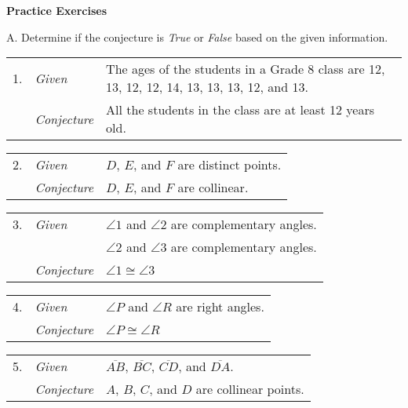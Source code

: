 \textbf{Practice Exercises}

\vspce

A. Determine if the conjecture is \emph{True} or \emph{False} based on the given information. 
\vspce 

\begin{tabular}{rN{5em}M{20em}}
1. & \textit{Given} & The ages of the students in a Grade 8 class are 12, 13, 12, 12, 14, 13, 13, 13, 12, and 13.\\
& \textit{Conjecture} & All the students in the class are at least 12 years old. \\
\end{tabular} 

\begin{tabular}{rN{5em}M{20em}}
2. & \textit{Given} & $D$, $E$, and $F$ are distinct points.\\
& \textit{Conjecture} & $D$, $E$, and $F$ are collinear.\\
\end{tabular} 

\begin{tabular}{rN{5em}M{20em}}
3. & \textit{Given} & $\angle{1}$ and $\angle{2}$ are complementary angles. \\
 & & $\angle{2}$ and $\angle{3}$ are complementary angles. \\
& \textit{Conjecture} & $\angle{1} \cong \angle{3} $\\
\end{tabular} 
  
\begin{tabular}{rN{5em}M{20em}}
4. & \textit{Given} & $\angle{P}$ and $\angle{R}$ are right  angles.\\
& \textit{Conjecture} & $\angle{P} \cong \angle{R} $\\
\end{tabular} 

\begin{tabular}{rN{5em}M{20em}}
5. & \textit{Given} & $\overline{AB} $, $\overline{BC}$, $\overline{CD}$, and $\overline{DA}$.  \\
& \textit{Conjecture} & $A$, $B$, $C$, and $D$ are collinear points.  \\
\end{tabular} 

